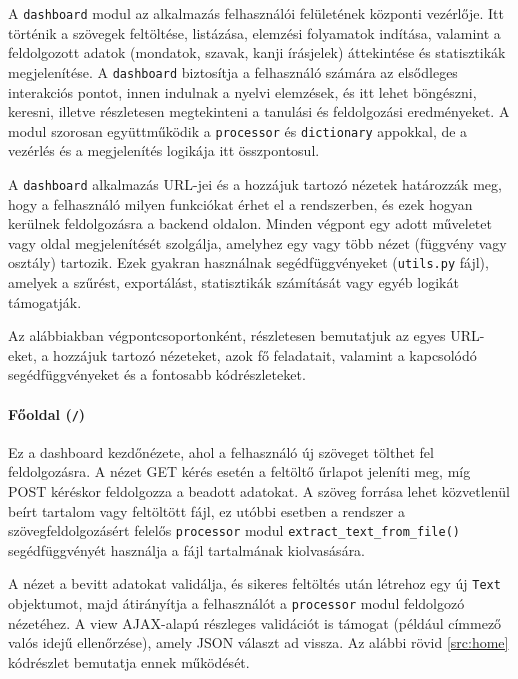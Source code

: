 A \texttt{dashboard} modul az alkalmazás felhasználói felületének központi vezérlője. Itt történik a szövegek feltöltése, listázása, elemzési folyamatok indítása, valamint a feldolgozott adatok (mondatok, szavak, kanji írásjelek) áttekintése és statisztikák megjelenítése. A \texttt{dashboard} biztosítja a felhasználó számára az elsődleges interakciós pontot, innen indulnak a nyelvi elemzések, és itt lehet böngészni, keresni, illetve részletesen megtekinteni a tanulási és feldolgozási eredményeket. A modul szorosan együttműködik a \texttt{processor} és \texttt{dictionary} appokkal, de a vezérlés és a megjelenítés logikája itt összpontosul.

A \texttt{dashboard} alkalmazás URL-jei és a hozzájuk tartozó nézetek határozzák meg, hogy a felhasználó milyen funkciókat érhet el a rendszerben, és ezek hogyan kerülnek feldolgozásra a backend oldalon. Minden végpont egy adott műveletet vagy oldal megjelenítését szolgálja, amelyhez egy vagy több nézet (függvény vagy osztály) tartozik. Ezek gyakran használnak segédfüggvényeket (\texttt{utils.py} fájl), amelyek a szűrést, exportálást, statisztikák számítását vagy egyéb logikát támogatják.

Az alábbiakban végpontcsoportonként, részletesen bemutatjuk az egyes URL-eket, a hozzájuk tartozó nézeteket, azok fő feladatait, valamint a kapcsolódó segédfüggvényeket és a fontosabb kódrészleteket.

\paragraph{Főoldal (\texttt{/})}

Ez a dashboard kezdőnézete, ahol a felhasználó új szöveget tölthet fel feldolgozásra. A nézet GET kérés esetén a feltöltő űrlapot jeleníti meg, míg POST kéréskor feldolgozza a beadott adatokat. A szöveg forrása lehet közvetlenül beírt tartalom vagy feltöltött fájl, ez utóbbi esetben a rendszer a szövegfeldolgozásért felelős \texttt{processor} modul \texttt{extract\_text\_from\_file()} segédfüggvényét használja a fájl tartalmának kiolvasására.

A nézet a bevitt adatokat validálja, és sikeres feltöltés után létrehoz egy új \texttt{Text} objektumot, majd átirányítja a felhasználót a \texttt{processor} modul feldolgozó nézetéhez. A view AJAX-alapú részleges validációt is támogat (például címmező valós idejű ellenőrzése), amely JSON választ ad vissza. Az alábbi rövid \ref{src:home} kódrészlet bemutatja ennek működését.

